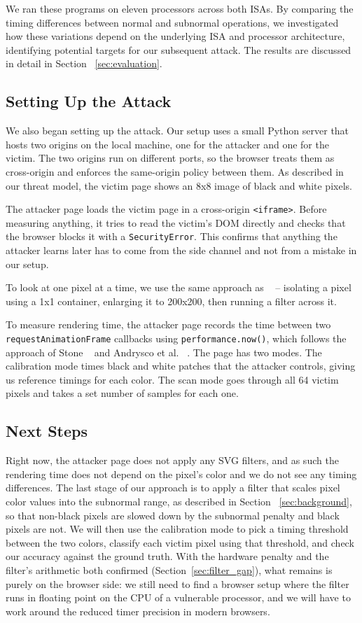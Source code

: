 We ran these programs on eleven processors across both ISAs. By comparing the timing differences between normal and subnormal operations, we investigated how these variations depend on the underlying ISA and processor architecture, identifying potential targets for our subsequent attack. The results are discussed in detail in Section ~\ref{sec:evaluation}.

\subsection{Setting Up the Attack}
We also began setting up the attack. Our setup uses a small Python server that hosts two origins on the local machine, one for the attacker and one for the victim. The two origins run on different ports, so the browser treats them as cross-origin and enforces the same-origin policy between them. As described in our threat model, the victim page shows an 8x8 image of black and white pixels. 

The attacker page loads the victim page in a cross-origin \texttt{<iframe>}. Before measuring anything, it tries to read the victim's DOM directly and checks that the browser blocks it with a \texttt{SecurityError}. This confirms that anything the attacker learns later has to come from the side channel and not from a mistake in our setup.

To look at one pixel at a time, we use the same approach as ~\cite{andrysco2015subnormal} -- isolating a pixel using a 1x1 container, enlarging it to 200x200, then running a filter across it. 

To measure rendering time, the attacker page records the time between two \texttt{requestAnimationFrame} callbacks using \texttt{performance.now()}, which follows the approach of Stone ~\cite{stone2013pixel} and Andrysco et al. ~\cite{andrysco2015subnormal}. The page has two modes. The calibration mode times black and white patches that the attacker controls, giving us reference timings for each color. The scan mode goes through all 64 victim pixels and takes a set number of samples for each one.

\subsection{Next Steps}
Right now, the attacker page does not apply any SVG filters, and as such the rendering time does not depend on the pixel's color and we do not see any timing differences. The last stage of our approach is to apply a filter that scales pixel color values into the subnormal range, as described in Section ~\ref{sec:background}, so that non-black pixels are slowed down by the subnormal penalty and black pixels are not. We will then use the calibration mode to pick a timing threshold between the two colors, classify each victim pixel using that threshold, and check our accuracy against the ground truth. With the hardware penalty and the filter's arithmetic both confirmed (Section~\ref{sec:filter_gap}), what remains is purely on the browser side: we still need to find a browser setup where the filter runs in floating point on the CPU of a vulnerable processor, and we will have to work around the reduced timer precision in modern browsers.
